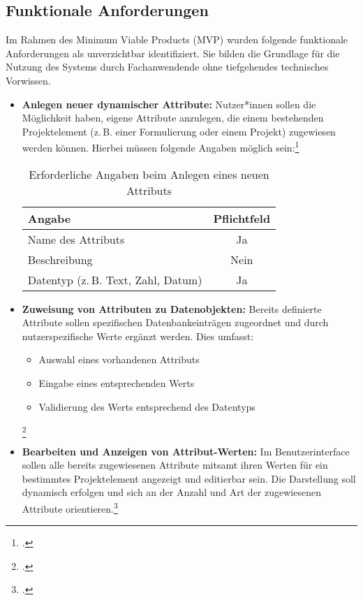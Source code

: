 \subsection{Funktionale Anforderungen}
Im Rahmen des Minimum Viable Products (MVP) wurden folgende funktionale Anforderungen als unverzichtbar identifiziert. 
Sie bilden die Grundlage für die Nutzung des Systems durch Fachanwendende ohne tiefgehendes technisches Vorwissen. 
\begin{itemize}
  \item \textbf{Anlegen neuer dynamischer Attribute:}  
Nutzer*innen sollen die Möglichkeit haben, eigene Attribute anzulegen, die einem bestehenden Projektelement 
(z.\,B. einer Formulierung oder einem Projekt) zugewiesen werden können. Hierbei müssen folgende Angaben möglich sein:\footcite{Nadkarni2001}

  \begin{table}[h!]
  \centering
  \begin{tabular}{|l|c|}
  \hline
  \textbf{Angabe}         & \textbf{Pflichtfeld} \\
  \hline
  Name des Attributs      & Ja               \\
  Beschreibung            & Nein                 \\
  Datentyp (z.\,B. Text, Zahl, Datum) & Ja    \\
  \hline
  \end{tabular}
  \caption{Erforderliche Angaben beim Anlegen eines neuen Attributs}
  \end{table}

  \item \textbf{Zuweisung von Attributen zu Datenobjekten:}  
Bereits definierte Attribute sollen spezifischen Datenbankeinträgen zugeordnet und durch nutzerspezifische Werte ergänzt werden. Dies umfasst:
\begin{itemize}
  \item Auswahl eines vorhandenen Attributs
  \item Eingabe eines entsprechenden Werts
  \item Validierung des Werts entsprechend des Datentyps
\end{itemize}\footcite[Vgl.][]{LiBox2005}

  \item \textbf{Bearbeiten und Anzeigen von Attribut-Werten:}  
Im Benutzerinterface sollen alle bereits zugewiesenen Attribute mitsamt ihren Werten für ein bestimmtes Projektelement angezeigt und editierbar sein. 
Die Darstellung soll dynamisch erfolgen und sich an der Anzahl und Art der zugewiesenen Attribute orientieren.\footcite[Vgl.][]{LiBox2005}


\end{itemize}
